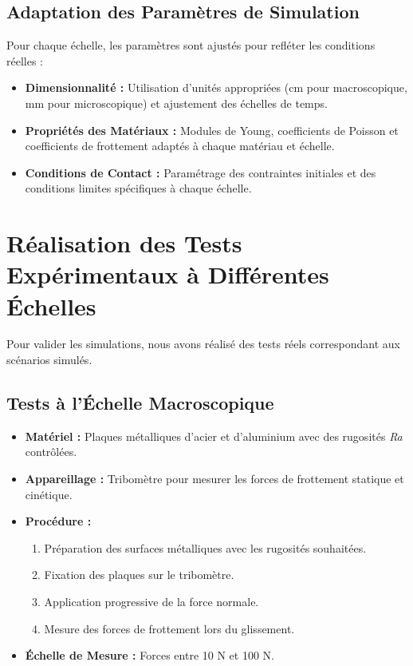 \subsection{Adaptation des Paramètres de Simulation}
Pour chaque échelle, les paramètres sont ajustés pour refléter les conditions réelles :
\begin{itemize}
    \item \textbf{Dimensionnalité :} Utilisation d'unités appropriées (cm pour macroscopique, mm pour microscopique) et ajustement des échelles de temps.
    \item \textbf{Propriétés des Matériaux :} Modules de Young, coefficients de Poisson et coefficients de frottement adaptés à chaque matériau et échelle.
    \item \textbf{Conditions de Contact :} Paramétrage des contraintes initiales et des conditions limites spécifiques à chaque échelle.
\end{itemize}

\section{Réalisation des Tests Expérimentaux à Différentes Échelles}
Pour valider les simulations, nous avons réalisé des tests réels correspondant aux scénarios simulés.

\subsection{Tests à l'Échelle Macroscopique}
\begin{itemize}
    \item \textbf{Matériel :} Plaques métalliques d'acier et d'aluminium avec des rugosités \textit{Ra} contrôlées.
    \item \textbf{Appareillage :} Tribomètre pour mesurer les forces de frottement statique et cinétique.
    \item \textbf{Procédure :}
    \begin{enumerate}
        \item Préparation des surfaces métalliques avec les rugosités souhaitées.
        \item Fixation des plaques sur le tribomètre.
        \item Application progressive de la force normale.
        \item Mesure des forces de frottement lors du glissement.
    \end{enumerate}
    \item \textbf{Échelle de Mesure :} Forces entre 10 N et 100 N.
\end{itemize}

